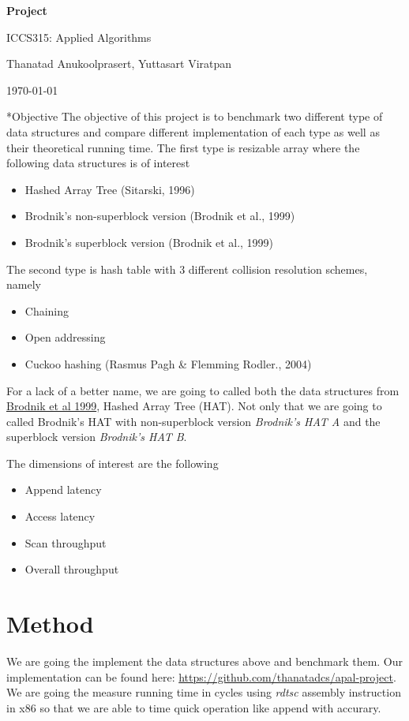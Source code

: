 \documentclass{article} %
\newcommand{\question}[2][]{\begin{flushleft}
                                \textbf{Question #1}: \textit{#2}

\end{flushleft}}
\newcommand{\maketitletwo}[2][]{\begin{center}
                                    \Large{\textbf{Project #1}

                                    ICCS315: Applied Algorithms} %
                                    \vspace{5pt}

                                    \normalsize{Thanatad Anukoolprasert, Yuttasart Viratpan   %

                                    \today}        %
                                    \vspace{15pt}

\end{center}}
\begin{document}
    \maketitletwo[]  %

    \section*{Objective}
    The objective of this project is to benchmark two different type of data structures and compare different
    implementation of each type as well as their theoretical running time.
    The first type is resizable array where the following data structures is of interest
    \begin{itemize}
        \item Hashed Array Tree (Sitarski, 1996)
        \item Brodnik's non-superblock version (Brodnik et al., 1999)
        \item Brodnik's superblock version (Brodnik et al., 1999)
    \end{itemize}

    The second type is hash table with 3 different collision resolution schemes, namely
    \begin{itemize}
        \item Chaining
        \item Open addressing
        \item Cuckoo hashing (Rasmus Pagh \& Flemming Rodler., 2004)
    \end{itemize}

    For a lack of a better name, we are going to called both the data structures from \href{ https://sedgewick.io/wp-content/themes/sedgewick/papers/1999Optimal.pdf}{ Brodnik et al 1999}, Hashed Array Tree (HAT).
    Not only that we are going to called Brodnik's HAT with non-superblock version \emph{Brodnik's HAT A} and the superblock version \emph{Brodnik's HAT B}.

    The dimensions of interest are the following
    \begin{itemize}
        \item Append latency
        \item Access latency
        \item Scan throughput
        \item Overall throughput
    \end{itemize}

    \section*{Method}
    We are going the implement the data structures above and benchmark them. Our implementation can be found here: \href{https://github.com/thanatadcs/apal-project}{ https://github.com/thanatadcs/apal-project}.
    We are going the measure running time in cycles using
    \emph{rdtsc} assembly instruction in x86 so that we are able to time quick operation like append with accurary.
\end{document}
